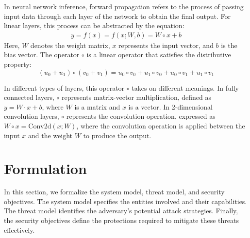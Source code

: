 \documentclass[conference]{IEEEtran}
\begin{document}
In neural network inference, forward propagation refers to the process of passing input data through each layer of the network to obtain the final output. For linear layers, this process can be abstracted by the equation:
\begin{equation*}
\begin{array}{c}
       y=f(x)=f(x;W,b)=W\circ x+b
\end{array}
\end{equation*}
Here, $W$ denotes the weight matrix, $x$ represents the input vector, and $b$ is the bias vector. The operator $\circ$ is a linear operator that satisfies the distributive property:
\begin{equation*}
       (u_0+u_1) \circ (v_0+v_1)=u_0 \circ v_0+u_1 \circ v_0+ u_0\circ v_1+ u_1\circ v_1
\end{equation*}

In different types of layers, this operator $\circ$ takes on different meanings. In fully connected layers, $\circ$ represents matrix-vector multiplication, defined as $y=W·x+b$, where $W$ is a matrix and $x$ is a vector. In 2-dimensional convolution layers, $\circ$ represents the convolution operation, expressed as $W\circ x=\text{Conv}2\text{d}(x;W)$, where the convolution operation is applied between the input $x$ and the weight $W$ to produce the output.

\section{Formulation}
In this section, we formalize the system model, threat model, and security objectives. The system model specifies the entities involved and their capabilities. The threat model identifies the adversary's potential attack strategies. Finally, the security objectives define the protections required to mitigate these threats effectively.
\end{document}
